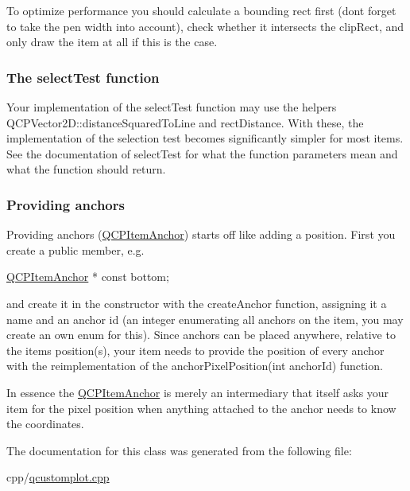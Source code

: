 To optimize performance you should calculate a bounding rect first (don\textquotesingle{}t forget to take the pen width into account), check whether it intersects the clip\+Rect, and only draw the item at all if this is the case.\hypertarget{class_q_c_p_abstract_item_items-selection}{}\subsubsection{The select\+Test function}\label{class_q_c_p_abstract_item_items-selection}
Your implementation of the select\+Test function may use the helpers Q\+C\+P\+Vector2\+D\+::distance\+Squared\+To\+Line and rect\+Distance. With these, the implementation of the selection test becomes significantly simpler for most items. See the documentation of select\+Test for what the function parameters mean and what the function should return.\hypertarget{class_q_c_p_abstract_item_anchors}{}\subsubsection{Providing anchors}\label{class_q_c_p_abstract_item_anchors}
Providing anchors (\mbox{\hyperlink{class_q_c_p_item_anchor}{Q\+C\+P\+Item\+Anchor}}) starts off like adding a position. First you create a public member, e.\+g.


\begin{DoxyCode}
\mbox{\hyperlink{class_q_c_p_item_anchor}{QCPItemAnchor}} * \textcolor{keyword}{const} bottom;
\end{DoxyCode}


and create it in the constructor with the create\+Anchor function, assigning it a name and an anchor id (an integer enumerating all anchors on the item, you may create an own enum for this). Since anchors can be placed anywhere, relative to the item\textquotesingle{}s position(s), your item needs to provide the position of every anchor with the reimplementation of the anchor\+Pixel\+Position(int anchor\+Id) function.

In essence the \mbox{\hyperlink{class_q_c_p_item_anchor}{Q\+C\+P\+Item\+Anchor}} is merely an intermediary that itself asks your item for the pixel position when anything attached to the anchor needs to know the coordinates. 

The documentation for this class was generated from the following file\+:\begin{DoxyCompactItemize}
\item 
cpp/\mbox{\hyperlink{qcustomplot_8cpp}{qcustomplot.\+cpp}}\end{DoxyCompactItemize}
